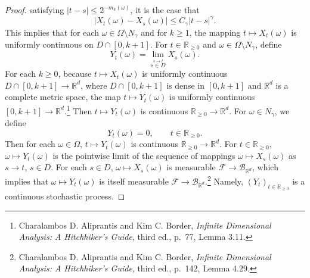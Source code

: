 \documentclass{article}
\theoremstyle{definition}
\theoremstyle{definition}
\begin{document}
\begin{proof}
satisfying $|t-s| \leq 2^{-m_k(\omega)}$, it is the case that
\begin{equation}
|X_t(\omega)-X_s(\omega)| \leq C_\gamma |t-s|^\gamma.
\label{399}
\end{equation}
This implies that for each $\omega \in \Omega \setminus N_\gamma$ and for $k \geq 1$,  the mapping
$t \mapsto X_t(\omega)$ is uniformly continuous on $D \cap [0,k+1]$. 
For $t \in \mathbb{R}_{\geq 0}$ and $\omega \in \Omega\setminus N_\gamma$, define
\begin{equation}
Y_t(\omega) = \lim_{\stackrel{s \to t}{s \in D}} X_s(\omega).
\label{3910}
\end{equation}
For each $k \geq 0$,
because $t \mapsto X_t(\omega)$ is uniformly continuous $D \cap  [0,k+1] \to \mathbb{R}^d$, 
where
$D \cap [0,k+1]$  is dense in $[0,k+1]$ and $\mathbb{R}^d$ is a complete metric space,
the map $t \mapsto Y_t(\omega)$ is uniformly continuous $[0,k+1] \to \mathbb{R}^d$.\footnote{Charalambos D. Aliprantis
and Kim C. Border, {\em Infinite Dimensional Analysis: A Hitchhiker's Guide}, third ed., p.~77, Lemma 3.11.}
Then $t \mapsto Y_t(\omega)$ is continuous $\mathbb{R}_{\geq 0} \to \mathbb{R}^d$.
For $\omega \in N_\gamma$, we define
\[
Y_t(\omega) = 0,\qquad t \in \mathbb{R}_{\geq 0}.
\]
Then for each $\omega \in \Omega$, $t \mapsto Y_t(\omega)$ is continuous $\mathbb{R}_{\geq 0} \to \mathbb{R}^d$.
For $t \in \mathbb{R}_{\geq 0}$, $\omega \mapsto Y_t(\omega)$ is the pointwise limit of the sequence of mappings
$\omega \mapsto X_s(\omega)$ as $s \to t$, $s \in D$.  For each $s \in D$, $\omega \mapsto X_s(\omega)$ is measurable
$\mathscr{F} \to \mathscr{B}_{\mathbb{R}^d}$, which implies that $\omega \mapsto Y_t(\omega)$ is itself measurable 
$\mathscr{F} \to \mathscr{B}_{\mathbb{R}^d}$.\footnote{Charalambos D. Aliprantis
and Kim C. Border, {\em Infinite Dimensional Analysis: A Hitchhiker's Guide}, third ed., p.~142, Lemma 4.29.}
 Namely, $(Y_t)_{t \in \mathbb{R}_{\geq 0}}$ is a continuous stochastic process.


\end{proof}
\end{document}
